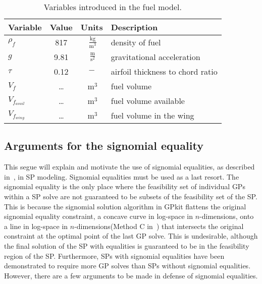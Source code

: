 \begin{footnotesize}
\begin{table}
    \centering
    \begin{tabular}{ l c c l}
        \toprule
        \textbf{Variable} & \textbf{Value} & \textbf{Units} & \textbf{Description} \\
        \midrule
        $\rho_f$ & 817 & $~\mathrm{\tfrac{kg}{m^{3}}}$ & density of fuel \\
        $g$ & 9.81 & $~\mathrm{\tfrac{m}{s^{2}}}$ & gravitational acceleration \\
        $\tau$ & 0.12 & $-$ & airfoil thickness to chord ratio \\
        $V_f$ & \ldots & $~\mathrm{m^{3}}$ & fuel volume \\
        $V_{f_{avail}}$ & \ldots & $~\mathrm{m^{3}}$ & fuel volume available \\
        $V_{f_{wing}}$ & \ldots & $~\mathrm{m^{3}}$ & fuel volume in the wing \\
        \bottomrule
    \end{tabular}
    \caption{Variables introduced in the fuel model.}
    \label{t:vars_fuelmodel}
\end{table} \end{footnotesize}

\subsection{Arguments for the signomial equality}
\label{s:sigeq}

This segue will explain and motivate the use of signomial equalities,
as described in~\cite{sigeqpaper}, in \gls{SP} modeling.
Signomial equalities must be used as a last resort. The signomial equality is the only place
where the feasibility set of individual \gls{GP}s within a \gls{SP} solve are not guaranteed
to be subsets of the feasibility set of the \gls{SP}. This is because the signomial solution
algorithm in GPkit flattens the original signomial equality constraint,
a concave curve in log-space in $n$-dimensions,
onto a line in log-space in $n$-dimensions(Method C in~\cite{sigeqpaper}) that intersects the
original constraint at the optimal point of the last \gls{GP} solve. This is undesirable, although
the final solution of the \gls{SP} with equalities
is guaranteed to be in the feasibility region of the \gls{SP}. Furthermore, \gls{SP}s
with signomial equalities have been demonstrated to require more \gls{GP} solves
than \gls{SP}s without signomial equalities. However, there are a few arguments
to be made in defense of signomial equalities.


